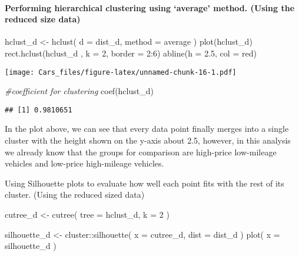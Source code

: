 \documentclass[
]{article}
\newenvironment{Shaded}{\begin{snugshade}}{\end{snugshade}}
\newcommand{\AttributeTok}[1]{\textcolor[rgb]{0.77,0.63,0.00}{#1}}
\newcommand{\CommentTok}[1]{\textcolor[rgb]{0.56,0.35,0.01}{\textit{#1}}}
\newcommand{\DecValTok}[1]{\textcolor[rgb]{0.00,0.00,0.81}{#1}}
\newcommand{\FloatTok}[1]{\textcolor[rgb]{0.00,0.00,0.81}{#1}}
\newcommand{\FunctionTok}[1]{\textcolor[rgb]{0.00,0.00,0.00}{#1}}
\newcommand{\NormalTok}[1]{#1}
\newcommand{\OtherTok}[1]{\textcolor[rgb]{0.56,0.35,0.01}{#1}}
\newcommand{\SpecialCharTok}[1]{\textcolor[rgb]{0.00,0.00,0.00}{#1}}
\newcommand{\StringTok}[1]{\textcolor[rgb]{0.31,0.60,0.02}{#1}}
\begin{document}
\hypertarget{performing-hierarchical-clustering-using-average-method.-using-the-reduced-size-data}{%
\paragraph{Performing hierarchical clustering using `average' method.
(Using the reduced size
data)}\label{performing-hierarchical-clustering-using-average-method.-using-the-reduced-size-data}}

\begin{Shaded}
\begin{Highlighting}[]
\NormalTok{hclust\_d }\OtherTok{\textless{}{-}} \FunctionTok{hclust}\NormalTok{(}
  \AttributeTok{d =}\NormalTok{ dist\_d,}
  \AttributeTok{method =} \StringTok{\textquotesingle{}average\textquotesingle{}}
\NormalTok{)}
\FunctionTok{plot}\NormalTok{(hclust\_d)}
\FunctionTok{rect.hclust}\NormalTok{(hclust\_d , }\AttributeTok{k =} \DecValTok{2}\NormalTok{, }\AttributeTok{border =} \DecValTok{2}\SpecialCharTok{:}\DecValTok{6}\NormalTok{)}
\FunctionTok{abline}\NormalTok{(}\AttributeTok{h =} \FloatTok{2.5}\NormalTok{, }\AttributeTok{col =} \StringTok{\textquotesingle{}red\textquotesingle{}}\NormalTok{)}
\end{Highlighting}
\end{Shaded}

\texttt{[image: Cars\_files/figure-latex/unnamed-chunk-16-1.pdf]}

\begin{Shaded}
\begin{Highlighting}[]
\CommentTok{\#coefficient for clustering}
\FunctionTok{coef}\NormalTok{(hclust\_d)}
\end{Highlighting}
\end{Shaded}

\begin{verbatim}
## [1] 0.9810651
\end{verbatim}

In the plot above, we can see that every data point finally merges into
a single cluster with the height shown on the y-axis about 2.5, however,
in this analysis we already know that the groups for comparison are
high-price low-mileage vehicles and low-price high-mileage vehicles.

Using Silhouette plots to evaluate how well each point fits with the
rest of its cluster. (Using the reduced sized data)

\begin{Shaded}
\begin{Highlighting}[]
\NormalTok{cutree\_d }\OtherTok{\textless{}{-}} \FunctionTok{cutree}\NormalTok{(}
  \AttributeTok{tree =}\NormalTok{ hclust\_d,}
  \AttributeTok{k =} \DecValTok{2}
\NormalTok{)}

\NormalTok{silhouette\_d }\OtherTok{\textless{}{-}}\NormalTok{ cluster}\SpecialCharTok{::}\FunctionTok{silhouette}\NormalTok{(}
  \AttributeTok{x =}\NormalTok{ cutree\_d,}
  \AttributeTok{dist =}\NormalTok{ dist\_d}
\NormalTok{)}
\FunctionTok{plot}\NormalTok{(}
  \AttributeTok{x =}\NormalTok{ silhouette\_d}
\NormalTok{)}
\end{Highlighting}
\end{Shaded}
\end{document}
